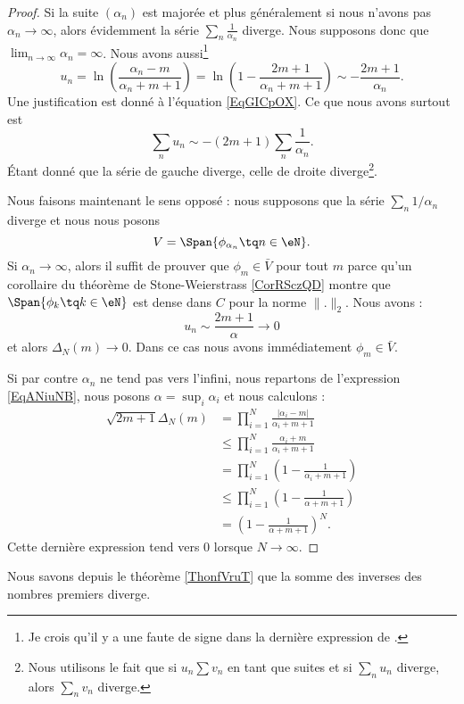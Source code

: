 \begin{proof}
    Si la suite \( (\alpha_n)\) est majorée et plus généralement si nous n'avons pas \( \alpha_n\to \infty\), alors évidemment la série \( \sum_n\frac{1}{ \alpha_n }\) diverge. Nous supposons donc que \( \lim_{n\to \infty} \alpha_n=\infty\). Nous avons aussi\footnote{Je crois qu'il y a une faute de signe dans la dernière expression de \cite{oYGash}.}
    \begin{equation}
        u_n=\ln\left( \frac{ \alpha_n-m }{ \alpha_n+m+1 } \right)=\ln\left( 1-\frac{ 2m+1 }{ \alpha_n+m+1 } \right)\sim-\frac{ 2m+1 }{ \alpha_n }.
    \end{equation}
    Une justification est donné à l'équation \eqref{EqGICpOX}. Ce que nous avons surtout est
    \begin{equation}
        \sum_n u_n\sim -(2m+1)\sum_n\frac{1}{ \alpha_n }.
    \end{equation}
    Étant donné que la série de gauche diverge, celle de droite diverge\footnote{Nous utilisons le fait que si \( u_n\sum v_n\) en tant que suites et si \( \sum_nu_n\) diverge, alors \( \sum_nv_n\) diverge.}.

    Nous faisons maintenant le sens opposé : nous supposons que la série \( \sum_n1/\alpha_n\) diverge et nous nous posons
    \begin{equation}
        V=\Span\{ \phi_{\alpha_n}\tq n\in \eN \}.
    \end{equation}
    Si \( \alpha_n\to \infty\), alors il suffit de prouver que \( \phi_m\in \bar V\) pour tout \( m\) parce qu'un corollaire du théorème de Stone-Weierstrass \ref{CorRSczQD} montre que \( \Span\{ \phi_k\tq k\in \eN \}\) est dense dans \( C\) pour la norme \( \| . \|_2\). Nous avons :
    \begin{equation}
        u_n\sim\frac{ 2m+1 }{ \alpha }\to 0
    \end{equation}
    et alors \( \Delta_N(m)\to 0\). Dans ce cas nous avons immédiatement \( \phi_m\in \bar V\).

    Si par contre \( \alpha_n\) ne tend pas vers l'infini, nous repartons de l'expression \eqref{EqANiuNB}, nous posons \( \alpha=\sup_i\alpha_i\) et nous calculons :
    \begin{subequations}
        \begin{align}
            \sqrt{2m+1}\Delta_N(m)&=\prod_{i=1}^N\frac{ | \alpha_i-m | }{ \alpha_i+m+1 }\\
            &\leq \prod_{i=1}^N\frac{ \alpha_i+m }{ \alpha_i+m+1 }\\
            &=\prod_{i=1}^N\left( 1-\frac{ 1 }{ \alpha_i+m+1 } \right)\\
            &\leq \prod_{i=1}^N\left( 1-\frac{1}{ \alpha+m+1 } \right)\\
            &=\left( 1-\frac{1}{ \alpha+m+1 } \right)^N.
        \end{align}
    \end{subequations}
    Cette dernière expression tend vers \( 0\) lorsque \( N\to \infty\).
\end{proof}

\begin{example}
    Nous savons depuis le théorème \ref{ThonfVruT} que la somme des inverses des nombres premiers diverge.
\end{example}
